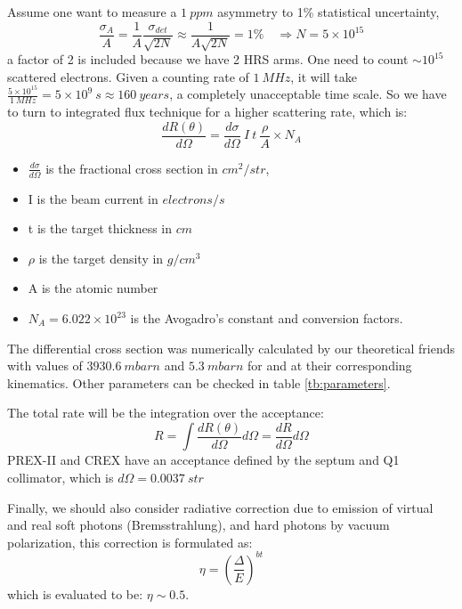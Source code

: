 Assume one want to measure a $1 \ ppm$ asymmetry to 1\% statistical uncertainty,
\begin{equation}
    \frac{\sigma_A}{A} = \frac{1}{A}\frac{\sigma_{det}}{\sqrt{2N}} 
    \approx \frac{1}{A\sqrt{2N}} = 1\% \quad 
    \Longrightarrow N = 5 \times 10^{15} 
    \label{eqn:statistical_error}
\end{equation}
a factor of 2 is included because we have 2 HRS arms.
One need to count $\sim10^{15}$ scattered electrons. Given a counting rate of $1\ MHz$, 
it will take $\frac{5\times 10^{15}}{1\ MHz} = 5\times 10^{9}\ s \approx 160 \ years$,
a completely unacceptable time scale. So we have to turn to integrated flux technique
for a higher scattering rate, which is:
\begin{equation}
    \frac{dR(\theta)}{d\Omega} = \frac{d\sigma}{d\Omega}\ I\ t\ \frac{\rho}{A} \times N_A   
\end{equation}
\begin{itemize}
    \item $\frac{d\sigma}{d\Omega}$ is the fractional cross section in $cm^2/str$,
    \item I is the beam current in $electrons/s$
    \item t is the target thickness in $cm$
    \item $\rho$ is the target density in $g/cm^{3}$
    \item A is the atomic number
    \item $N_A = 6.022\times 10^{23}$ is the Avogadro's constant and conversion factors.
\end{itemize}

The differential cross section was numerically calculated by our theoretical friends
with values of $3930.6 \ mbarn$ and $5.3 \ mbarn$ for \Pb and \Ca at their corresponding
kinematics. Other parameters can be checked in table \ref{tb:parameters}.

The total rate will be the integration over the acceptance:
\begin{equation}
    R = \int \frac{dR(\theta)}{d\Omega} d\Omega = \frac{dR}{d\Omega} d\Omega
\end{equation}
PREX-II and CREX have an acceptance defined by the septum and Q1 collimator, which
is $d\Omega = 0.0037 \ str$

Finally, we should also consider radiative correction due to emission of virtual
and real soft photons (Bremsstrahlung), and hard photons by vacuum polarization,
this correction is formulated as:
\begin{equation}
    \eta = \left(\frac{\Delta}{E} \right)^{bt}
\end{equation}
which is evaluated to be: $\eta \sim 0.5$.

